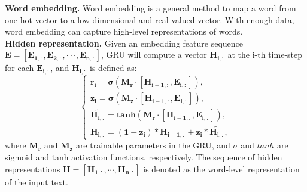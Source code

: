 \documentclass[letterpaper]{article} %
\begin{document}
\noindent \textbf{Word embedding.}
Word embedding is a general method to map a word from one hot vector to a low dimensional and real-valued vector. With enough data, word embedding can capture high-level representations of words.
\\
\textbf{Hidden representation.}
Given an embedding feature sequence $\mathbf{E = [E_{1,:}, E_{2,:}, \cdot \cdot \cdot, E_{n,:}] }$, GRU will compute a vector $\mathbf{H_{i,:}}$ at the i-th time-step for each $\mathbf{E_{i,:}}$, and  $\mathbf{H_{i,:}}$ is defined as:
\begin{equation}
\left\{
\begin{array}{lr}
\mathbf{r_{i} = \sigma(M_{r}\cdot[H_{i-1,:},E_{i,:}])},\\
\mathbf{z_{i} = \sigma(M_{z}\cdot[H_{i-1,:},E_{i,:}])},\\
\mathbf{\widetilde{H_{i,:}} = tanh(M_{r}\cdot[H_{i-1,:},E_{i,:}])},\\
\mathbf{H_{i,:} = (1-z_{i})*H_{i-1,:}+z_{i}*\widetilde{H_{i,:}}},
\end{array}
\right.
\end{equation}
where $\mathbf{M_{r}}$ and $\mathbf{M_{z}}$ are trainable parameters in the GRU, and $\sigma$ and $tanh$ are sigmoid and tanh activation functions, respectively.
The sequence of hidden representations $\mathbf{H = [H_{1,:}, \cdots, H_{n,:}]}$ is denoted as the word-level representation of the input text.
\end{document}
